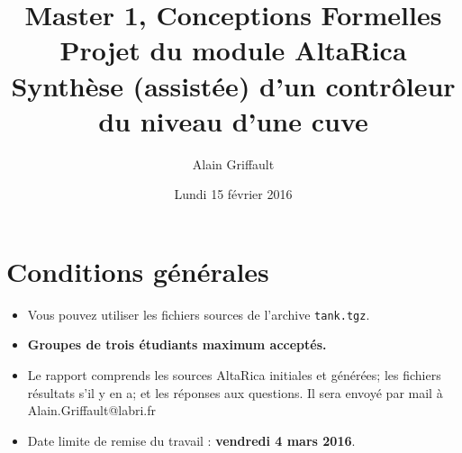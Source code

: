 \documentclass[a4paper]{article}
\newcommand{\altarica}{{\sc AltaRica}}
\begin{document}
\title{Master 1, Conceptions Formelles\\
Projet du module \altarica\\
Synthèse (assistée) d'un contrôleur du niveau d'une cuve}

\date{Lundi 15 février 2016}

\author{Alain Griffault}

\maketitle



\section{Conditions générales}

\begin{itemize}
\item Vous pouvez utiliser les fichiers sources de l'archive {\tt tank.tgz}.
\item {\bf Groupes de trois étudiants maximum acceptés.}
\item Le rapport comprends les sources AltaRica initiales et générées; les fichiers résultats s'il y en a; et les réponses aux questions. Il sera envoyé par mail à Alain.Griffault@labri.fr
\item Date limite de remise du travail : {\bf vendredi 4 mars 2016}.
\end{itemize}
\end{document}
